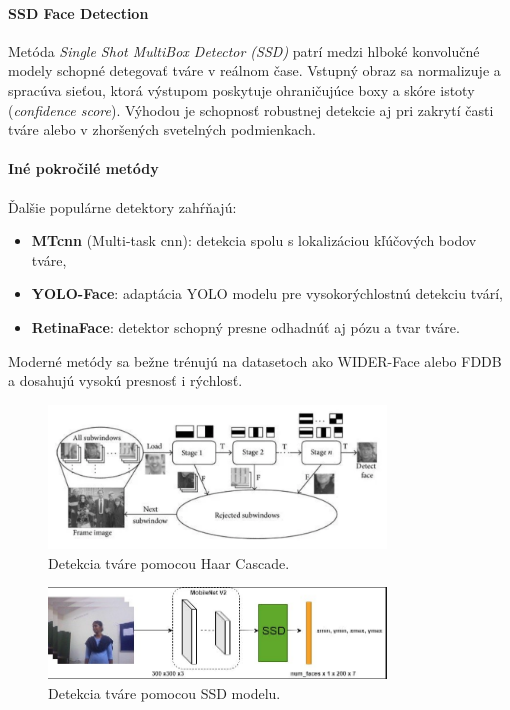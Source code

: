 \paragraph{SSD Face Detection}
Metóda \emph{Single Shot MultiBox Detector (SSD)} patrí medzi hlboké konvolučné modely schopné detegovať tváre v reálnom čase. Vstupný obraz sa normalizuje a spracúva sieťou, ktorá výstupom poskytuje ohraničujúce boxy a skóre istoty (\emph{confidence score}). Výhodou je schopnosť robustnej detekcie aj pri zakrytí časti tváre alebo v zhoršených svetelných podmienkach.

\paragraph{Iné pokročilé metódy}
Ďalšie populárne detektory zahŕňajú:
\begin{itemize}
    \item \textbf{MT\gls{cnn}} (Multi-task \gls{cnn}): detekcia spolu s lokalizáciou kľúčových bodov tváre,
    \item \textbf{YOLO-Face}: adaptácia YOLO modelu pre vysokorýchlostnú detekciu tvárí,
    \item \textbf{RetinaFace}: detektor schopný presne odhadnúť aj pózu a tvar tváre.
\end{itemize}

Moderné metódy sa bežne trénujú na datasetoch ako WIDER-Face alebo FDDB a dosahujú vysokú presnosť i rýchlosť.

\begin{figure}[!htpb]
    \centering
    \includegraphics[width=0.8\textwidth]{img/haar_cascade.png}
    \caption{Detekcia tváre pomocou Haar Cascade.} 
    \label{fig:haar_cascade}
\end{figure}

\begin{figure}[!htpb]
    \centering
    \includegraphics[width=0.8\textwidth]{img/ssd_model.png}
    \caption{Detekcia tváre pomocou SSD modelu.} 
    \label{fig:ssd_model}
\end{figure}

